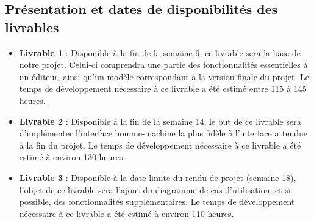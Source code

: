 \documentclass[hidelinks, 10pt,a4paper]{article}
\begin{document}
\subsection{Présentation et dates de disponibilités des livrables}
\begin{itemize}
\item \textbf{Livrable 1} : Disponible à la fin de la semaine 9, ce livrable sera la
base de notre projet. Celui-ci comprendra une partie des fonctionnalités essentielles
à un éditeur, ainsi qu'un modèle correspondant à la version finale du projet.
Le temps de développement nécessaire à ce livrable a été estimé entre 115 à 145 heures.
\item \textbf{Livrable 2} : Disponible à la fin de la semaine 14, le but de ce livrable
sera d'implémenter l'interface homme-machine la plus fidèle à l'interface attendue à
la fin du projet.
Le temps de développement nécessaire à ce livrable a été estimé à environ 130 heures.
\item \textbf{Livrable 3} : Disponible à la date limite du rendu de projet (semaine 18),
l'objet de ce livrable sera l'ajout du diagramme de cas d'utilisation, et si possible, des
fonctionnalités supplémentaires.
Le temps de développement nécessaire à ce livrable a été estimé à environ 110 heures.
\end{itemize}
\end{document}
